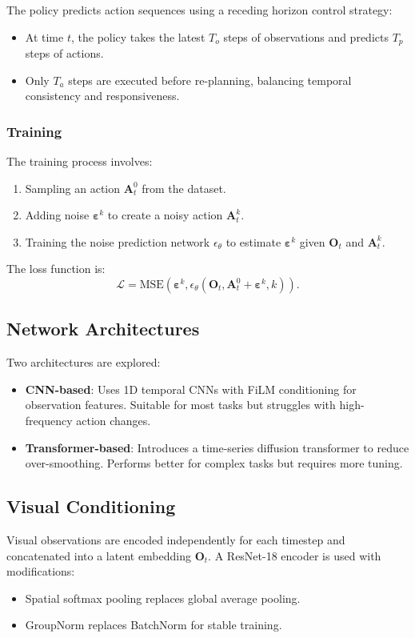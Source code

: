 \documentclass[12pt]{article}
\begin{document}
\begin{appendices}
The policy predicts action sequences using a receding horizon control strategy:
\begin{itemize}
    \item At time \(t\), the policy takes the latest \(T_o\) steps of observations and predicts \(T_p\) steps of actions.
    \item Only \(T_a\) steps are executed before re-planning, balancing temporal consistency and responsiveness.
\end{itemize}

\subsubsection*{Training}
The training process involves:
\begin{enumerate}
    \item Sampling an action \(\mathbf{A}_t^0\) from the dataset.
    \item Adding noise \(\boldsymbol{\varepsilon}^k\) to create a noisy action \(\mathbf{A}_t^k\).
    \item Training the noise prediction network \(\epsilon_\theta\) to estimate \(\boldsymbol{\varepsilon}^k\) given \(\mathbf{O}_t\) and \(\mathbf{A}_t^k\).
\end{enumerate}

The loss function is:
\[
\mathcal{L} = \text{MSE}(\boldsymbol{\varepsilon}^k, \epsilon_\theta(\mathbf{O}_t, \mathbf{A}_t^0 + \boldsymbol{\varepsilon}^k, k)).
\]

\subsection*{Network Architectures}
Two architectures are explored:
\begin{itemize}
    \item \textbf{CNN-based}: Uses 1D temporal CNNs with FiLM conditioning for observation features. Suitable for most tasks but struggles with high-frequency action changes.
    \item \textbf{Transformer-based}: Introduces a time-series diffusion transformer to reduce over-smoothing. Performs better for complex tasks but requires more tuning.
\end{itemize}

\subsection*{Visual Conditioning}
Visual observations are encoded independently for each timestep and concatenated into a latent embedding \(\mathbf{O}_t\). A ResNet-18 encoder is used with modifications:
\begin{itemize}
    \item Spatial softmax pooling replaces global average pooling.
    \item GroupNorm replaces BatchNorm for stable training.
\end{itemize}


\end{appendices}
\end{document}

